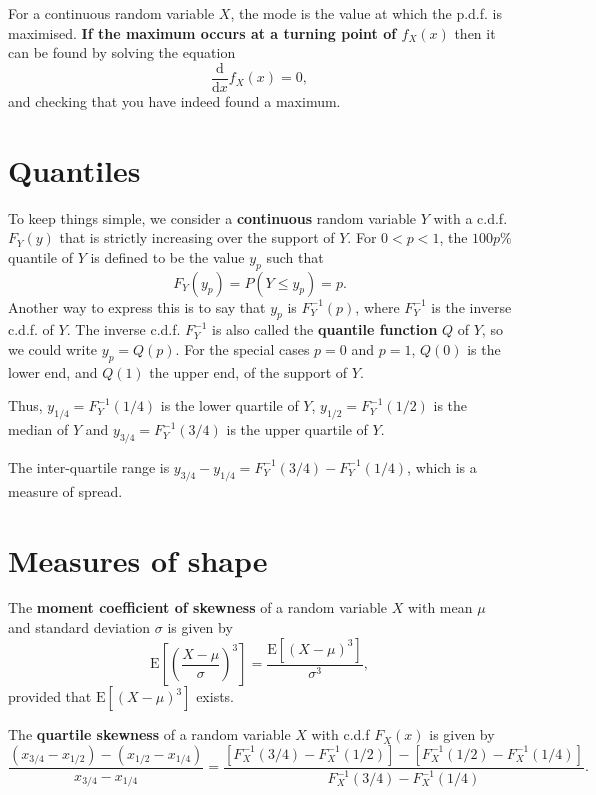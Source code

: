 \documentclass[
  british,
  11pt,
  openany, a4paper]{book}
\begin{document}
For a continuous random variable \(X\), the mode is the value at which the p.d.f. is maximised. \textbf{If the maximum occurs at a turning point of \(f_X(x)\)} then it can be found by solving the equation
\[ \frac{\mathrm{d}}{\mathrm{d}x} f_X(x)  = 0, \]
and checking that you have indeed found a maximum.

\section{Quantiles}\label{quantiles}

To keep things simple, we consider a \textbf{continuous} random variable \(Y\) with a c.d.f. \(F_Y(y)\) that is strictly increasing over the support of \(Y\). For \(0 < p < 1\), the \(100p\%\) quantile of \(Y\) is defined to be the value \(y_p\) such that \[ F_Y(y_p)=P(Y \leq y_p) = p. \]
Another way to express this is to say that \(y_p\) is \(F_Y^{-1}(p)\), where \(F_Y^{-1}\) is the inverse c.d.f. of \(Y\). The inverse c.d.f. \(F_Y^{-1}\) is also called the \textbf{quantile function} \(Q\) of \(Y\), so we could write \(y_p = Q(p)\). For the special cases \(p = 0\) and \(p = 1\), \(Q(0)\) is the lower end, and \(Q(1)\) the upper end, of the support of \(Y\).

Thus, \(y_{1/4}=F_Y^{-1}(1/4)\) is the lower quartile of \(Y\), \(y_{1/2}=F_Y^{-1}(1/2)\) is the median of \(Y\) and \(y_{3/4}=F_Y^{-1}(3/4)\) is the upper quartile of \(Y\).

The inter-quartile range is \(y_{3/4}-y_{1/4}=F_Y^{-1}(3/4)-F_Y^{-1}(1/4)\), which is a measure of spread.

\section{Measures of shape}\label{measures-of-shape}

The \textbf{moment coefficient of skewness} of a random variable \(X\) with mean \(\mu\) and standard deviation \(\sigma\) is given by
\[ \mathrm{E}\left[\left(\frac{X - \mu}{\sigma}\right)^3\right] = \displaystyle\frac{\mathrm{E}\left[\left(X- \mu\right)^3\right]}{\sigma^3}, \]
provided that \(\mathrm{E}[\left(X- \mu\right)^3]\) exists.

The \textbf{quartile skewness} of a random variable \(X\) with c.d.f \(F_X(x)\) is given by
\[ \frac{(x_{3/4}-x_{1/2}) - (x_{1/2}-x_{1/4})}{x_{3/4}-x_{1/4}} = \frac{[F^{-1}_X(3/4) - F^{-1}_X(1/2)] - [F^{-1}_X(1/2) - F^{-1}_X(1/4)]}{F^{-1}_X(3/4) - F^{-1}_X(1/4)}. \]
\end{document}
